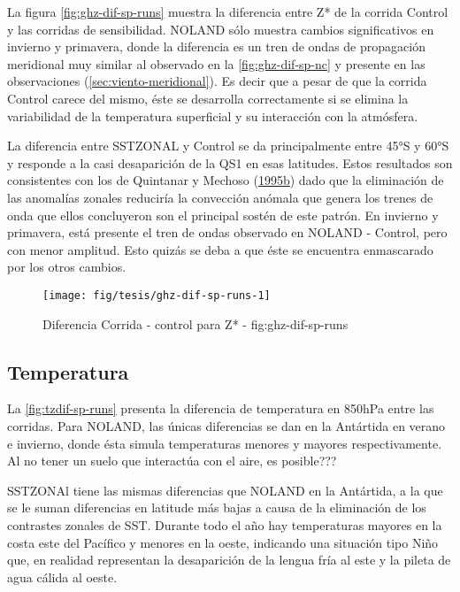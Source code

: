 \documentclass[spanish,a4paper,12p]{book}
\begin{document}
La figura \autoref{fig:ghz-dif-sp-runs} muestra la diferencia entre Z*
de la corrida Control y las corridas de sensibilidad. NOLAND sólo
muestra cambios significativos en invierno y primavera, donde la
diferencia es un tren de ondas de propagación meridional muy similar al
observado en la \autoref{fig:ghz-dif-sp-nc} y presente en las
observaciones (\autoref{sec:viento-meridional}). Es decir que a pesar de
que la corrida Control carece del mismo, éste se desarrolla
correctamente si se elimina la variabilidad de la temperatura
superficial y su interacción con la atmósfera.

La diferencia entre SSTZONAL y Control se da principalmente entre 45°S y
60°S y responde a la casi desaparición de la QS1 en esas latitudes.
Estos resultados son consistentes con los de Quintanar y Mechoso
(\protect\hyperlink{ref-Quintanar1995}{1995}\protect\hyperlink{ref-Quintanar1995}{b})
dado que la eliminación de las anomalías zonales reduciría la convección
anómala que genera los trenes de onda que ellos concluyeron son el
principal sostén de este patrón. En invierno y primavera, está presente
el tren de ondas observado en NOLAND - Control, pero con menor amplitud.
Esto quizás se deba a que éste se encuentra enmascarado por los otros
cambios.

\begin{figure*}
\texttt{[image: fig/tesis/ghz-dif-sp-runs-1]} \caption{Diferencia Corrida - control para Z* - fig:ghz-dif-sp-runs}\label{fig:ghz-dif-sp-runs}
\end{figure*}

\subsection{Temperatura}\label{temperatura-2}

La \autoref{fig:tzdif-sp-runs} presenta la diferencia de temperatura en
850hPa entre las corridas. Para NOLAND, las únicas diferencias se dan en
la Antártida en verano e invierno, donde ésta simula temperaturas
menores y mayores respectivamente. Al no tener un suelo que interactúa
con el aire, es posible???

SSTZONAl tiene las mismas diferencias que NOLAND en la Antártida, a la
que se le suman diferencias en latitude más bajas a causa de la
eliminación de los contrastes zonales de SST. Durante todo el año hay
temperaturas mayores en la costa este del Pacífico y menores en la
oeste, indicando una situación tipo Niño que, en realidad representan la
desaparición de la lengua fría al este y la pileta de agua cálida al
oeste.
\end{document}
